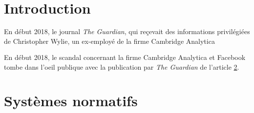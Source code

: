 \documentclass[11pt]{article}
\newcommand{\philnewpage}{}
\begin{document}

\tableofcontents
\setcounter{page}{1}
\newpage

\section{Introduction}

  En début 2018, le journal \emph{The Guardian}, qui reçevait des informations
  privilégiées de Christopher Wylie, un ex-employé de la firme Cambridge Analytica

  En début 2018, le scandal concernant la firme Cambridge Analytica et Facebook
  tombe dans l'oeil publique avec la publication par \emph{The Guardian} de
  l'article \ref{}.

















\philnewpage
\section{Systèmes normatifs}
\end{document}
